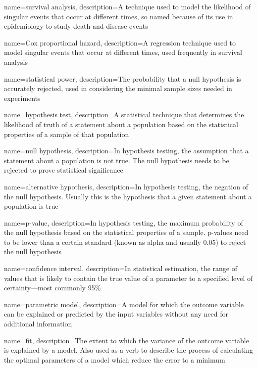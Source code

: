{
    name={survival analysis},
    description={A technique used to model the likelihood of singular events that occur at different times, so named because of its use in epidemiology to study death and disease events}
}

{
    name={Cox proportional hazard},
    description={A regression technique used to model singular events that occur at different times, used frequently in survival analysis}
}

{
    name={statistical power},
    description={The probability that a null hypothesis is accurately rejected, used in considering the minimal sample sizes needed in experiments}
}

{
    name={hypothesis test},
    description={A statistical technique that determines the likelihood of truth of a statement about a population based on the statistical properties of a sample of that population}
}

{
    name={null hypothesis},
    description={In hypothesis testing, the assumption that a statement about a population is not true.  The null hypothesis needs to be rejected to prove statistical significance}
}

{
    name={alternative hypothesis},
    description={In hypothesis testing, the negation of the null hypothesis.  Usually this is the hypothesis that a given statement about a population is true}
}

{
    name={p-value},
    description={In hypothesis testing, the maximum probability of the null hypothesis based on the statistical properties of a sample. p-values need to be lower than a certain standard (known as alpha and usually 0.05) to reject the null hypothesis}
}

{
    name={confidence interval},
    description={In statistical estimation, the range of values that is likely to contain the true value of a parameter to a specified level of certainty---most commonly 95\%}
}

{
    name={parametric model},
    description={A model for which the outcome variable can be explained or predicted by the input variables without any need for additional information}
}

{
    name={fit},
    description={The extent to which the variance of the outcome variable is explained by a model.  Also used as a verb to describe the process of calculating the optimal parameters of a model which reduce the error to a minimum}
}


